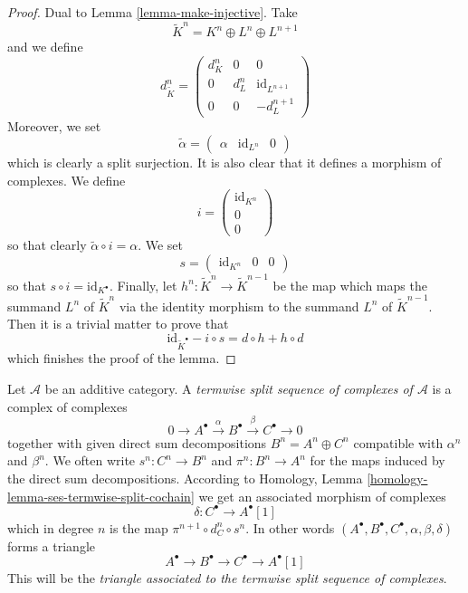 \begin{proof}
Dual to
Lemma \ref{lemma-make-injective}.
Take
$$
\tilde K^n = K^n \oplus L^n \oplus L^{n + 1}
$$
and we define
$$
d^n_{\tilde K} =
\left(
\begin{matrix}
d^n_K & 0 & 0 \\
0 & d^n_L & \text{id}_{L^{n + 1}} \\
0 & 0 & -d^{n + 1}_L
\end{matrix}
\right)
$$
Moreover, we set
$$
\tilde \alpha =
\left(
\begin{matrix}
\alpha &
\text{id}_{L^n} &
0
\end{matrix}
\right)
$$
which is clearly a split surjection. It is also clear that it defines a
morphism of complexes. We define
$$
i =
\left(
\begin{matrix}
\text{id}_{K^n} \\
0 \\
0
\end{matrix}
\right)
$$
so that clearly $\tilde \alpha \circ i = \alpha$. We set
$$
s =
\left(
\begin{matrix}
\text{id}_{K^n} &
0 &
0
\end{matrix}
\right)
$$
so that $s \circ i = \text{id}_{K^\bullet}$. Finally,
let $h^n : \tilde K^n \to \tilde K^{n - 1}$ be the map
which maps the summand $L^n$ of $\tilde K^n$ via the identity morphism
to the summand $L^n$ of $\tilde K^{n - 1}$. Then it is a trivial matter
to prove that
$$
\text{id}_{\tilde K^\bullet} - i \circ s
=
d \circ h + h \circ d
$$
which finishes the proof of the lemma.
\end{proof}

\begin{definition}
\label{definition-split-ses}
Let $\mathcal{A}$ be an additive category.
A {\it termwise split sequence of complexes of $\mathcal{A}$}
is a complex of complexes
$$
0 \to
A^\bullet \xrightarrow{\alpha}
B^\bullet \xrightarrow{\beta}
C^\bullet \to 0
$$
together with given direct sum decompositions
$B^n = A^n \oplus C^n$
compatible with $\alpha^n$ and $\beta^n$.
We often write $s^n : C^n \to B^n$ and $\pi^n : B^n \to A^n$
for the maps induced by the direct sum decompositions.
According to
Homology, Lemma \ref{homology-lemma-ses-termwise-split-cochain}
we get an associated morphism of complexes
$$
\delta : C^\bullet \longrightarrow A^\bullet[1]
$$
which in degree $n$ is the map $\pi^{n + 1} \circ d_C^n \circ s^n$.
In other words
$(A^\bullet, B^\bullet, C^\bullet, \alpha, \beta, \delta)$
forms a triangle
$$
A^\bullet \to B^\bullet \to C^\bullet \to A^\bullet[1]
$$
This will be the {\it triangle associated to the termwise
split sequence of complexes}.
\end{definition}


